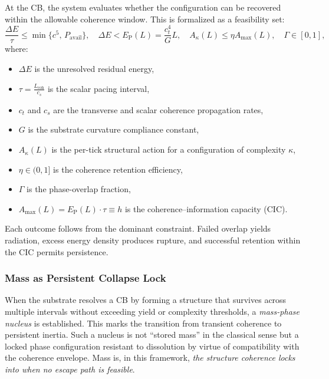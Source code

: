 \documentclass[preprints,article,submit,pdftex,moreauthors]{Definitions/mdpi}
\begin{document}
At the CB, the system evaluates whether the configuration can be recovered within the allowable coherence window. This is formalized as a feasibility set:
\begin{equation}
\frac{\Delta E}{\tau} \leq \min\{c^5,\,P_{\mathrm{avail}}\}, \quad
\Delta E < E_{\mathrm{P}}(L) = \frac{c_t^4}{G}L, \quad
A_\kappa(L) \leq \eta A_{\max}(L), \quad
\Gamma \in [0,1],
\label{eq:collapse_constraints}
\end{equation}
where:
\begin{itemize}
\item \( \Delta E \) is the unresolved residual energy,
\item \( \tau = \frac{L_{\mathrm{coh}}}{c_s} \) is the scalar pacing interval,
\item \( c_t \) and \( c_s \) are the transverse and scalar coherence propagation rates,
\item \( G \) is the substrate curvature compliance constant,
\item \( A_\kappa(L) \) is the per-tick structural action for a configuration of complexity \( \kappa \),
\item \( \eta \in (0,1] \) is the coherence retention efficiency,
\item \( \Gamma \) is the phase-overlap fraction,
\item \( A_{\max}(L) = E_{\mathrm{P}}(L)\cdot\tau \equiv h \) is the coherence–information capacity (CIC).
\end{itemize}

Each outcome follows from the dominant constraint. Failed overlap yields radiation, excess energy density produces rupture, and successful retention within the CIC permits persistence.

\subsubsection*{Mass as Persistent Collapse Lock}

When the substrate resolves a CB by forming a structure that survives across multiple intervals without exceeding yield or complexity thresholds, a \emph{mass-phase nucleus} is established. This marks the transition from transient coherence to persistent inertia. Such a nucleus is not “stored mass” in the classical sense but a locked phase configuration resistant to dissolution by virtue of compatibility with the coherence envelope. Mass is, in this framework, \emph{the structure coherence locks into when no escape path is feasible}.
\end{document}
